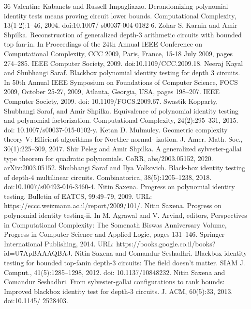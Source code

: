 \documentclass[10pt,a4paper]{article}
\begin{document}
\begin{thebibliography}{36}
Valentine Kabanets and Russell Impagliazzo. Derandomizing polynomial identity tests means proving circuit lower bounds. Computational Complexity, 13(1-2):1–46, 2004. doi:10.1007/ s00037-004-0182-6.
Zohar S. Karnin and Amir Shpilka. Reconstruction of generalized depth-3 arithmetic circuits with bounded top fan-in. In Proceedings of the 24th Annual IEEE Conference on Computational Complexity, CCC 2009, Paris, France, 15-18 July 2009, pages 274–285. IEEE Computer Society, 2009. doi:10.1109/CCC.2009.18.
Neeraj Kayal and Shubhangi Saraf. Blackbox polynomial identity testing for depth 3 circuits. In 50th Annual IEEE Symposium on Foundations of Computer Science, FOCS 2009, October 25-27, 2009, Atlanta, Georgia, USA, pages 198–207. IEEE Computer Society, 2009. doi: 10.1109/FOCS.2009.67.
Swastik Kopparty, Shubhangi Saraf, and Amir Shpilka. Equivalence of polynomial identity testing and polynomial factorization. Computational Complexity, 24(2):295–331, 2015. doi: 10.1007/s00037-015-0102-y.
Ketan D. Mulmuley. Geometric complexity theory V: Efficient algorithms for Noether normal- ization. J. Amer. Math. Soc., 30(1):225–309, 2017.
Shir Peleg and Amir Shpilka. A generalized sylvester-gallai type theorem for quadratic polynomials. CoRR, abs/2003.05152, 2020. arXiv:2003.05152.
Shubhangi Saraf and Ilya Volkovich. Black-box identity testing of depth-4 multilinear circuits. Combinatorica, 38(5):1205–1238, 2018. doi:10.1007/s00493-016-3460-4.
Nitin Saxena. Progress on polynomial identity testing. Bulletin of EATCS, 99:49–79, 2009. URL: https://eccc.weizmann.ac.il/report/2009/101/.
Nitin Saxena. Progress on polynomial identity testing-ii. In M. Agrawal and V. Arvind, editors, Perspectives in Computational Complexity: The Somenath Biswas Anniversary Volume, Progress in Computer Science and Applied Logic, pages 131–146. Springer International Publishing, 2014. URL: https://books.google.co.il/books?id=U7ApBAAAQBAJ.
Nitin Saxena and Comandur Seshadhri. Blackbox identity testing for bounded top-fanin depth-3 circuits: The field doesn’t matter. SIAM J. Comput., 41(5):1285–1298, 2012. doi: 10.1137/10848232.
Nitin Saxena and Comandur Seshadhri. From sylvester-gallai configurations to rank bounds: Improved blackbox identity test for depth-3 circuits. J. ACM, 60(5):33, 2013. doi:10.1145/ 2528403.

\end{thebibliography}
\end{document}
